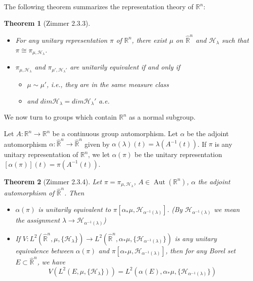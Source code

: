 \documentclass[
  12pt
]{article}
\newtheorem{thm}{Theorem}[section]
\theoremstyle{plain}
\newcommand{\mpi}{\ensuremath{\pi}\xspace}
\newcommand{\bbr}{\ensuremath{\mathbb{R}}\xspace}
\newcommand{\hilb}{\ensuremath{\mathscr{H}}\xspace}
\DeclareMathOperator{\Aut}{Aut}
\begin{document}
  The following theorem summarizes the representation theory of $\bbr^n$:

  \begin{thm}[Zimmer 2.3.3]
    \label{thm:2.3.3}
    \begin{itemize}
      \item For any unitary representation $\pi$ of
        $\mathbb{R}^n$, there exist $\mu$ on $\hat{\mathbb{R}}^n$ and $\mathscr{H}_{\lambda}$
        such that $\pi \cong \pi_{\mu, \mathscr{H}_{\lambda}}$.
      \item $\pi_{\mu, \mathscr{H}_{\lambda}}$ and
        $\pi_{\mu', \mathscr{H}_{\lambda}'}$ are unitarily equivalent if and only if 
        \begin{itemize}
          \item $\mu \sim \mu'$, i.e., they are in the same measure class
          \item and $dim\mathscr{H}_{\lambda} = dim \mathscr{H}_{\lambda}'$ a.e.
        \end{itemize}
    \end{itemize}
  \end{thm}

  We now turn to groups which contain $\bbr^n$ as a normal subgroup.

  Let $A:\bbr^n \rightarrow \bbr^n$ be a continuous group automorphism. Let
  $\alpha$ be the adjoint automorphism $\alpha:\hat{\bbr}^n \rightarrow \hat{\bbr}^n$ given
  by $\alpha(\lambda)(t) = \lambda(A^{-1}(t))$. If \mpi is any unitary
  representation of $\bbr^n$, we let $\alpha(\pi)$  be the unitary
  representation $[\alpha(\pi)](t) = \pi(A^{-1}(t))$.


  \begin{thm}[Zimmer 2.3.4]
    \label{thm:2.3.4}
    Let $\pi = \pi_{\mu, \hilb_{\lambda}}$, $A\in  \Aut(\bbr^n)$, $\alpha$ the
    adjoint automorphism of $\hat{\bbr}^n$. Then
    \begin{itemize}
      \item $\alpha(\pi)$ is unitarily equivalent to $\pi[\alpha_*\mu, \hilb_{\alpha^{-1}(\lambda)}]$. (By $\hilb_{\alpha^{-1}(\lambda)}$ we mean the assignment $\lambda \rightarrow \hilb_{\alpha^{-1}(\lambda)}$)
      \item If $V:L^2(\hat{\bbr}^n, \mu, \{\hilb_{\lambda}\}) \rightarrow L^2(\hat{\bbr}^n, \alpha_*\mu, \{\hilb_{\alpha^{-1}(\lambda)}\})$ is any unitary equivalence between $\alpha(\pi)$ and $\pi[\alpha_*\mu, \hilb_{\alpha^{-1}(\lambda)}]$, then for any Borel set $E \subset \hat{\bbr}^n$, we have
        $$
        V(L^2(E, \mu, \{\hilb_{\lambda}\})) = L^2(\alpha(E), \alpha_*\mu, \{\hilb_{\alpha^{-1}(\lambda)}\})
        $$
    \end{itemize}
  \end{thm}
\end{document}
